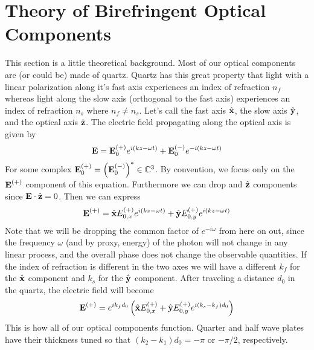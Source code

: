 \section{Theory of Birefringent Optical Components}
	
	This section is a little theoretical background. Most of our optical components are (or could be) made of quartz. Quartz has this great property that light with a linear polarization along it's fast axis experiences an index of refraction $n_f$ whereas light along the slow axis (orthogonal to the fast axis) experiences an index of refraction $n_s$ where $n_f\neq n_s$. Let's call the fast axis $\hat{\textbf{\rmfamily x\normalfont}}$, the slow axis $\hat{\textbf{\rmfamily y\normalfont}}$, and the optical axis $\hat{\textbf{\rmfamily z\normalfont}}$. The electric field propagating along the optical axis is given by
	\begin{equation}
		\textbf{\rmfamily E\normalfont} = \textbf{\rmfamily E\normalfont}_0^{(+)}e^{i(kz-\omega t)}+\textbf{\rmfamily E\normalfont}_0^{(-)}e^{-i(kz-\omega t)}
	\end{equation}
	For some complex $\textbf{\rmfamily E\normalfont}_0^{(+)} = \left(\textbf{\rmfamily E\normalfont}_0^{(-)}\right)^\ast \in \mathbb{C}^3$. By convention, we focus only on the $\textbf{\rmfamily E\normalfont}^{(+)}$ component of this equation. Furthermore we can drop and $\hat{\textbf{\rmfamily z\normalfont}}$ components since $\textbf{\rmfamily E\normalfont}\cdot\hat{\textbf{\rmfamily z\normalfont}}=0$. Then we can express
	\begin{equation}
		\textbf{\rmfamily E\normalfont}^{(+)} = \hat{\textbf{\rmfamily x\normalfont}} E_{0,x}^{(+)} e^{i(kz-\omega t)} + \hat{\textbf{\rmfamily y\normalfont}} E_{0,y}^{(+)}e^{i(kz-\omega t)}
	\end{equation}
	Note that we will be dropping the common factor of $e^{-i\omega}$ from here on out, since the frequency $\omega$ (and by proxy, energy) of the photon will not change in any linear process, and the overall phase does not change the observable quantities. If the index of refraction is different in the two axes we will have a different $k_f$ for the $\hat{\textbf{\rmfamily x\normalfont}}$ component and $k_s$ for the $\hat{\textbf{\rmfamily y\normalfont}}$ component. After traveling a distance $d_0$ in the quartz, the electric field will become
	\begin{equation}
		\textbf{\rmfamily E\normalfont}^{(+)} = e^{ik_fd_0}\left(\hat{\textbf{\rmfamily x\normalfont}} E_{0,x}^{(+)}+\hat{\textbf{\rmfamily y\normalfont}} E_{0,y}^{(+)}e^{i(k_s-k_f)d_0}\right)
	\end{equation}
	This is how all of our optical components function. Quarter and half wave plates have their thickness tuned so that $(k_2-k_1) d_0 = -\pi$ or $-\pi/2$, respectively.